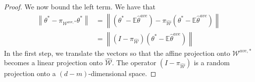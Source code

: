 \documentclass[twoside]{article}
\DeclareMathOperator*{\vecspan}{span}
\newcommand{\W}{\mathcal{\hat W}}
\newcommand{\Wave}{{\mathcal{\hat W}^{ave}}}
\newcommand{\Wtave}{{\mathcal{W}^{ave,*}}}
\newcommand{\E}{\mathbb{E}}
\newcommand{\w}{\theta}
\newcommand{\wave}{\hat\w^{ave}}
\newcommand{\wtave}{\E\hat\w^{ave}}
\newcommand{\wmle}{\hat\w^{mle}}
\newcommand{\wstar}{{\w^{*}}}
\newcommand{\tbias}{t_{\text{\textit{bias}}}}
\newcommand{\ltwo}[1]{{\left\lVert {#1} \right\rVert}}
\newcommand{\proj}[1]{\pi_{{#1}}}
\newcommand{\prob}[1]{\Pr\left[{#1}\right]}
\newcommand{\ignore}[1]{}
\newcommand{\fixme}[1]{\textbf{FIXME:} {#1}}
\begin{document}
\begin{proof}
We now bound the left term.
We have that
\begin{align}
\ltwo{\wstar-\proj\Wtave\wstar}
&=
\ltwo{(\wstar-\wtave)-\proj\W(\wstar-\wtave)}
\\&=
\ltwo{(I-\proj\W)(\wstar-\wtave)}
\end{align}
In the first step, we translate the vectors so that the affine projection onto $\Wtave$ becomes a linear projection onto $\W$.
The operator $(I-\proj\W)$ is a random projection onto a $(d-m)$-dimensional space.

\ignore{
Note that the space $\Wave$ depends on the data.
Therefore, we can think of $\proj\Wave\wstar$ as an estimator of $\wstar$.
As in the proof of Theorem \ref{thm:wave},
we begin by decomposing the MSE of $\proj\Wave\wstar$ into its bias and variance components.
\begin{equation}
\begin{split}
\ltwo{\wstar-\proj\Wave\wstar}^2
&=
\ltwo{\wstar-\E\proj\Wave\wstar}^2
\\&+
\ltwo{\E\proj\Wave\wstar-\proj\Wave\wstar}^2
\end{split}
\end{equation}
We begin with the variance.

We have that
\begin{align}
\ltwo{\wstar-\proj\Wave\wstar}
&\le
\ltwo{\wstar-\proj\Wtave\wstar}
+
\ltwo{\proj\Wtave\wstar-\proj\Wave\wstar}
\\
&=
\ltwo{\wstar-\proj\Wtave\wstar}
+
\ltwo{\wave-\wtave}
\label{eq:errdecomp}
\end{align}
The first line follows from the triangle inequality.
The second line follows because every point in $\Wtave$ is a translation of a point in $\Wave$ by the vector $\wave-\wtave$.

}
\end{proof}
\end{document}
